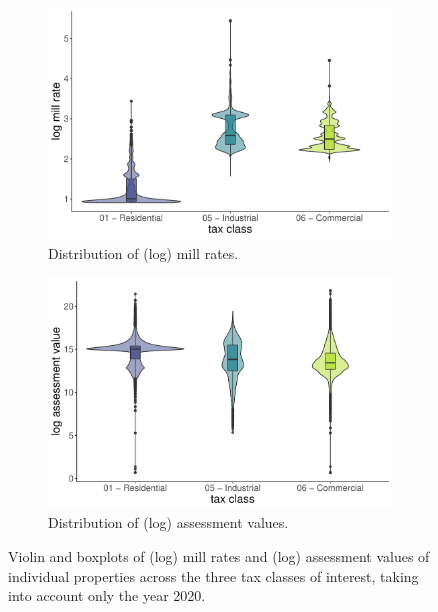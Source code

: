 \documentclass{article}
\begin{document}
\begin{figure}[ht]
\centering
\begin{subfigure}{.5\textwidth}
  \centering
  \includegraphics[width=.9\textwidth]{figures/7. violin mill rates.pdf}
  \caption{Distribution of (log) mill rates.}
  \label{fig:violin_millrate}
\end{subfigure}%
\begin{subfigure}{.5\textwidth}
  \centering
  \includegraphics[width=.9\textwidth]{figures/7.1 violin assessment values.pdf}
  \caption{Distribution of (log) assessment values.}
  \label{fig:violin_assessment}
\end{subfigure}
\caption{Violin and boxplots of (log) mill rates and (log) assessment values of individual properties across the three tax classes of interest, taking into account only the year 2020.}
\label{fig:violin}
\end{figure}


\end{document}

